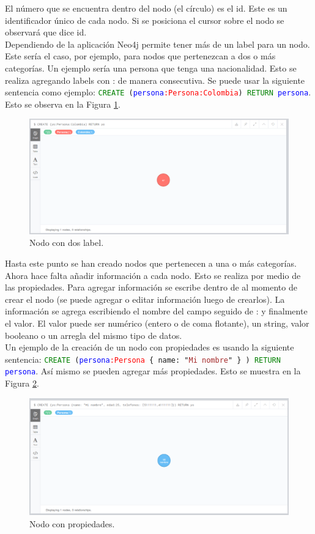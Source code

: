 \documentclass[conference]{IEEEtran}
\begin{document}
El número que se encuentra dentro del nodo (el círculo) es el id. Este es un identificador único de cada nodo. Si se posiciona el cursor sobre el nodo se observará que dice id.
\\
Dependiendo de la aplicación Neo4j permite tener más de un label para un nodo. Este sería el caso, por ejemplo, para nodos que pertenezcan a dos o más categorías. Un ejemplo sería una persona que tenga una nacionalidad. Esto se realiza agregando labels con : de manera consecutiva. Se puede usar la siguiente sentencia como ejemplo: \texttt{\textcolor{green}{CREATE} (\textcolor{blue}{persona}\textcolor{red}{:Persona:Colombia}) \textcolor{green}{RETURN} \textcolor{blue}{persona}}. Esto se observa en la Figura \ref{fig18}.

\begin{figure}[H]
\begin{center}
\includegraphics[width= 0.45 \textwidth]{crear_nodo_label2.png}
\end{center}
\caption{Nodo con dos label.}
\label{fig18}
\end{figure}

Hasta este punto se han creado nodos que pertenecen a una o más categorías. Ahora hace falta añadir información a cada nodo. Esto se realiza por medio de las propiedades. Para agregar información se escribe dentro de {} al momento de crear el nodo (se puede agregar o editar información luego de crearlos). La información se agrega escribiendo el nombre del campo seguido de : y finalmente el valor. El valor puede ser numérico (entero o de coma flotante), un string, valor booleano o un arregla del mismo tipo de datos.
\\
Un ejemplo de la creación de un nodo con propiedades es usando la siguiente sentencia:  \texttt{\textcolor{green}{CREATE} (\textcolor{blue}{persona}\textcolor{red}{:Persona} \{ name:  "\textcolor{brown}{Mi nombre}" \} ) \textcolor{green}{RETURN} \textcolor{blue}{persona}}. Así mismo se pueden agregar más propiedades. Esto se muestra en la Figura \ref{fig19}.

\begin{figure}[H]
\begin{center}
\includegraphics[width= 0.45 \textwidth]{crear_nodo_prop1.png}
\end{center}
\caption{Nodo con propiedades.}
\label{fig19}
\end{figure}
\end{document}
